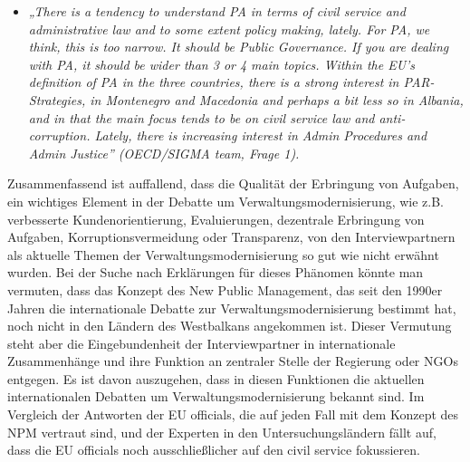 \begin{itemize}[label={}]
\item \textit{„There is a tendency to understand PA in terms of civil service and administrative law and to some extent policy making, lately. For PA, we think, this is too narrow. It should be Public Governance. If you are dealing with PA, it should be wider than 3 or 4 main topics. Within the EU’s definition of PA in the three countries, there is a strong interest in PAR-Strategies, in Montenegro and Macedonia and perhaps a bit less so in Albania, and in that the main focus tends to be on civil service law and anti-corruption. Lately, there is increasing interest in Admin Procedures and Admin Justice” (OECD/SIGMA team, Frage 1). }
\end{itemize}
Zusammenfassend ist auffallend, dass die Qualität der Erbringung von Aufgaben, ein wichtiges Element in der Debatte um Verwaltungsmodernisierung, wie z.B. verbesserte Kundenorientierung, Evaluierungen, dezentrale Erbringung von Aufgaben, Korruptionsvermeidung oder Transparenz, von den Interviewpartnern als aktuelle Themen der Verwaltungsmodernisierung so gut wie nicht erwähnt wurden. Bei der Suche nach Erklärungen für dieses Phänomen könnte man vermuten, dass das Konzept des New Public Management, das seit den 1990er Jahren die internationale Debatte zur Verwaltungsmodernisierung bestimmt hat, noch nicht in den Ländern des Westbalkans angekommen ist. Dieser Vermutung steht aber die Eingebundenheit der Interviewpartner in internationale Zusammenhänge und ihre Funktion an zentraler Stelle der Regierung oder NGOs entgegen. Es ist davon auszugehen, dass in diesen Funktionen die aktuellen internationalen Debatten um Verwaltungsmodernisierung bekannt sind. Im Vergleich der Antworten der EU officials, die auf jeden Fall mit dem Konzept des NPM vertraut sind, und der Experten in den Untersuchungsländern fällt auf, dass die EU officials noch ausschließlicher auf den civil service fokussieren.
